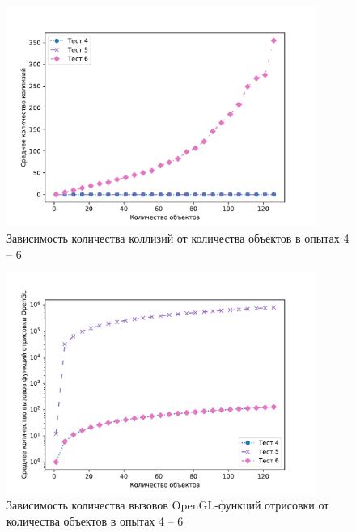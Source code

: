 \begin{figure}[H]
	\centering
    \includegraphics[width=0.9\textwidth]{img/456/plot_collisions.pdf}
	\caption{Зависимость количества коллизий от количества объектов в опытах 4 -- 6}
	\label{fig:456:col}
\end{figure}

\begin{figure}[H]
	\centering
    \includegraphics[width=0.9\textwidth]{img/456/plot_draw_calls.pdf}
	\caption{Зависимость количества вызовов OpenGL-функций отрисовки от количества объектов в опытах 4 -- 6}
	\label{fig:456:dc}
\end{figure}

